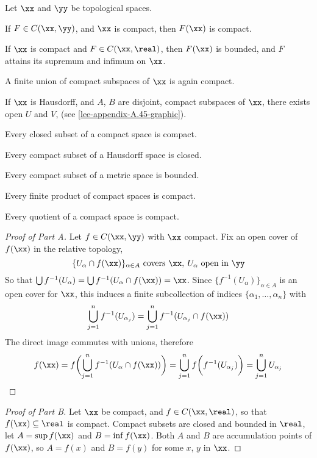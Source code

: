 \documentclass[../main-v2-manifolds.tex]{subfiles}
\begin{document}
\begin{wts}\label{lee-appendix-A.45}
Let $\xx$ and $\yy$ be topological spaces.
\begin{enumalpha}
    \item If $F\in C(\xx,\yy)$, and $\xx$ is compact, then $F(\xx)$ is compact.
    \item If $\xx$ is compact and $F\in C(\xx,\real)$, then $F(\xx)$ is bounded, and $F$ attains its supremum and infimum on $\xx$.
    \item A finite union of compact subspaces of $\xx$ is again compact.
    \item If $\xx$ is Hausdorff, and $A$, $B$ are disjoint, compact subspaces of $\xx$, there exists open $U$ and $V$, (see \cref{lee-appendix-A.45-graphic}).
    
    \item Every closed subset of a compact space is compact.
    \item Every compact subset of a Hausdorff space is closed.
    \item Every compact subset of a metric space is bounded.
    \item Every finite product of compact spaces is compact.
    \item Every quotient of a compact space is compact.
\end{enumalpha}
\end{wts}

\begin{proof}[Proof of  Part A]
    Let $f\in C(\xx,\yy)$ with $\xx$ compact. Fix an open cover of $f(\xx)$ in the relative topology, 
    \[
        \{U_\alpha\cap f(\xx)\}_{\alpha\in A}\text{ covers }\xx,\: U_\alpha\text{ open in }\yy
    \]    
    So that $\bigcup f^{-1}(U_\alpha) = \bigcup f^{-1}(U_\alpha\cap f(\xx))=\xx$. Since $\{f^{-1}(U_\alpha)\}_{\alpha\in A}$ is an open cover for $\xx$, this induces a finite subcollection of indices $\{\alpha_1,\ldots,\alpha_n\}$ with
    \[
        \bigcup_{j=1}^nf^{-1}(U_{\alpha_j}) = \bigcup_{j=1}^nf^{-1}(U_{\alpha_j}\cap f(\xx))
    \]
    The direct image commutes with unions, therefore
    \[
        f(\xx)=f\biggl(\bigcup_{j=1}^nf^{-1}(U_\alpha\cap f(\xx))\biggr) = \bigcup_{j=1}^nf\biggl(f^{-1}(U_{\alpha_j})\biggr) = \bigcup_{j=1}^n U_{\alpha_j}
    \]
\end{proof}


\begin{proof}[Proof of  Part B]
    Let $\xx$ be compact, and $f\in C(\xx,\real)$, so that $f(\xx)\subseteq\real$ is compact. Compact subsets are closed and bounded in $\real$, let $A = \sup f(\xx)$ and $B = \inf f(\xx)$. Both $A$ and $B$ are accumulation points of $f(\xx)$, so $A = f(x)$ and $B = f(y)$ for some $x$, $y$ in $\xx$.
\end{proof}
\end{document}

